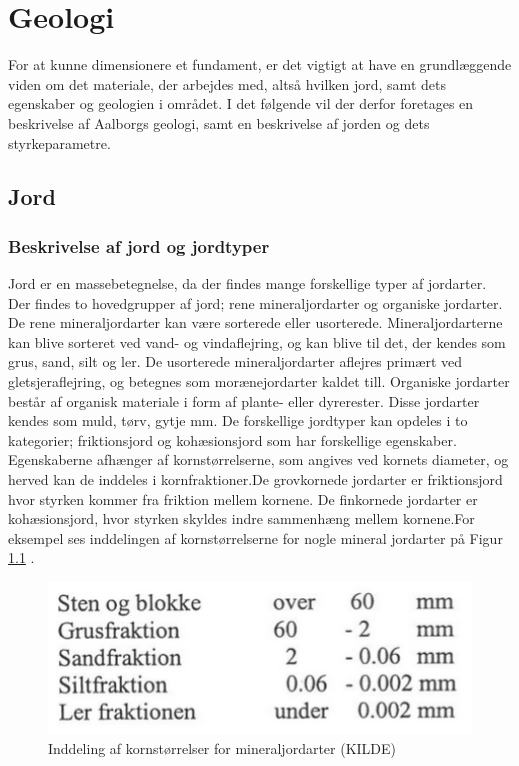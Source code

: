 \chapter{Geologi}
For at kunne dimensionere et fundament, er det vigtigt at have en grundlæggende viden om det materiale, der arbejdes med, altså hvilken jord, samt dets egenskaber og geologien i området. I det følgende vil der derfor foretages en beskrivelse af Aalborgs geologi, samt en beskrivelse af jorden og dets styrkeparametre.

\section{Jord}
\subsection{Beskrivelse af jord og jordtyper}
Jord er en massebetegnelse, da der findes mange forskellige typer af jordarter. Der findes to hovedgrupper af jord; rene mineraljordarter og organiske jordarter. 
\newline \indent{     }  De rene mineraljordarter kan være sorterede eller usorterede. Mineraljordarterne kan blive sorteret ved vand- og vindaflejring, og kan blive til det, der kendes som grus, sand, silt og ler. De usorterede mineraljordarter aflejres primært ved gletsjeraflejring, og betegnes som morænejordarter kaldet till.\citep{jordarter}
\newline \indent{     }  Organiske jordarter består af organisk materiale i form af plante- eller dyrerester. Disse jordarter kendes som muld, tørv, gytje mm.\citep{miljo}
\newline \indent{     } De forskellige jordtyper kan opdeles i to kategorier; friktionsjord og kohæsionsjord som har forskellige egenskaber. Egenskaberne afhænger af kornstørrelserne, som angives ved kornets diameter, og herved kan de inddeles i kornfraktioner\citep{geoteknik}.De grovkornede jordarter er friktionsjord hvor styrken kommer fra friktion mellem kornene. De finkornede jordarter er kohæsionsjord, hvor styrken skyldes indre sammenhæng mellem kornene.For eksempel ses inddelingen af kornstørrelserne for nogle mineral jordarter på Figur \ref{fig:kornstorrelser} .

\begin{figure}[htbp]	\centering
	\begin{minipage}[b]{0.48\textwidth}
		\includegraphics[width=1.0\textwidth]{billeder/kornetsdiameter.png}
		\caption{Inddeling af kornstørrelser for mineraljordarter (KILDE)}
		\label{fig:kornstorrelser}
	\end{minipage}\hfill
\end{figure}

